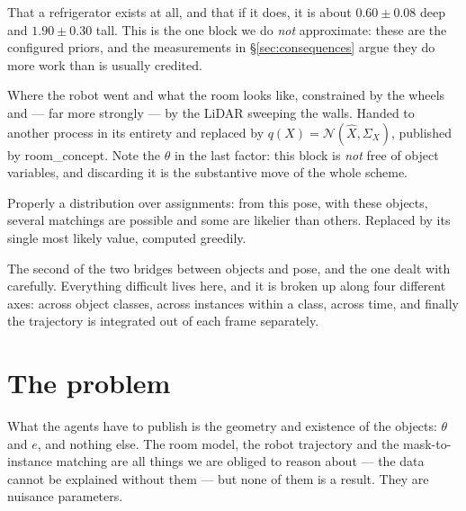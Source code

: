 \documentclass[11pt,a4paper]{report}
\newcommand{\given}{\,|\,}
\theoremstyle{definition}   %
\begin{document}
\begin{description}[style=nextline,leftmargin=1.4em,itemsep=9pt,parsep=2pt]

\item[\normalfont \ding{192}\ding{193}\; $P(e)\,P(\theta\given e)$ \;---\; \textbf{what objects are}]
That a refrigerator exists at all, and that if it does, it is about $0.60\pm0.08$ deep and
$1.90\pm0.30$ tall. This is the one block we do \emph{not} approximate: these are the configured
priors, and the measurements in \S\ref{sec:consequences} argue they do more work than is usually
credited.

\item[\normalfont \ding{194}--\ding{197}\; $P(R)P(X)P(\Phi\given X)P(L\given X,R,\theta)$ \;---\; \textbf{where the robot is}]
Where the robot went and what the room looks like, constrained by the wheels and --- far more
strongly --- by the LiDAR sweeping the walls. Handed to another process in its entirety and
replaced by $q(X)=\mathcal{N}(\hat X,\Sigma_X)$, published by \textsf{room\_concept}. Note the
$\theta$ in the last factor: this block is \emph{not} free of object variables, and discarding it
is the substantive move of the whole scheme.

\item[\normalfont \ding{198}\; $P(M\given\theta,e,X)$ \;---\; \textbf{whose mask is whose}]
Properly a distribution over assignments: from this pose, with these objects, several matchings
are possible and some are likelier than others. Replaced by its single most likely value,
computed greedily.

\item[\normalfont \ding{199}\; $P(Z\given\theta,M,X)$ \;---\; \textbf{how masks arise}]
The second of the two bridges between objects and pose, and the one dealt with carefully.
Everything difficult lives here, and it is broken up along four different axes: across object
classes, across instances within a class, across time, and finally the trajectory is integrated
out of each frame separately.

\end{description}

\section{The problem}
\label{sec:problem}

What the agents have to publish is the geometry and existence of the objects: $\theta$ and $e$,
and nothing else. The room model, the robot trajectory and the mask-to-instance matching are all
things we are obliged to reason about --- the data cannot be explained without them --- but none
of them is a result. They are nuisance parameters.
\end{document}
